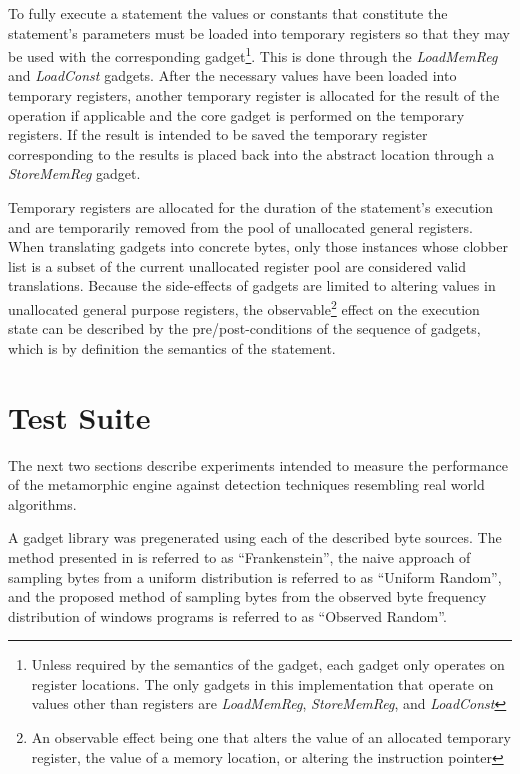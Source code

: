 \documentclass[finalcopy,short]{srpaper}
\begin{document}
            To fully execute a statement the values or constants that constitute
            the statement's parameters must be loaded into temporary registers so
            that they may be used with the corresponding gadget\footnote{Unless
            required by the semantics of the gadget, each gadget only operates
            on register locations. The only gadgets in this implementation that
            operate on values other than registers are \emph{LoadMemReg},
            \emph{StoreMemReg}, and \emph{LoadConst}}.  This is done through the
            \emph{LoadMemReg} and \emph{LoadConst} gadgets.  After the necessary
            values have been loaded into temporary registers, another temporary
            register is allocated for the result of the operation if applicable
            and the core gadget is performed on the temporary registers.  If the
            result is intended to be saved the temporary register corresponding
            to the results is placed back into the abstract location through a
            \emph{StoreMemReg} gadget.
            
            Temporary registers are allocated for the duration of the
            statement's execution and are temporarily removed from the pool of
            unallocated general registers. When translating gadgets into
            concrete bytes, only those instances whose clobber list is a subset
            of the current unallocated register pool are considered valid
            translations. Because the side-effects of gadgets are limited to
            altering values in unallocated general purpose registers, the
            observable\footnote{An observable effect being one that alters the
            value of an allocated temporary register, the value of a memory
            location, or altering the instruction pointer} effect on the
            execution state can be described by the pre/post-conditions of the
            sequence of gadgets, which is by definition the semantics of the
            statement.
        
    \section{Test Suite}

        The next two sections describe experiments intended to measure the
        performance of the metamorphic engine against detection techniques
        resembling real world algorithms.

        A gadget library was pregenerated using each of the described byte
        sources.  The method presented in \cite{franken} is referred to as
        ``Frankenstein'', the naive approach of sampling bytes from a uniform
        distribution is referred to as ``Uniform Random'', and the proposed
        method of sampling bytes from the observed byte frequency distribution
        of windows programs is referred to as ``Observed Random''.
\end{document}
